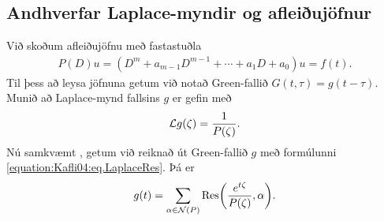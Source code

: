 \documentclass[a4paper,10pt,icelandic]{sphinxmanual}
\begin{document}
\subsection{Andhverfar Laplace-myndir og afleiðujöfnur}
\label{\detokenize{Kafli04:andhverfar-laplace-myndir-og-afleiujofnur}}
Við skoðum afleiðujöfnu með fastastuðla
\begin{equation*}
\begin{split}P(D)u=(D^m+a_{m-1}D^{m-1}+\cdots+a_1D+a_0)u=f(t).\end{split}
\end{equation*}
Til þess að leysa jöfnuna getum við notað Green-fallið \(G(t,\tau)=g(t-\tau)\).
Munið að Laplace-mynd fallsins \(g\) er gefin með
\begin{equation*}
\begin{split}{{\cal L}}g(\zeta)=\dfrac 1{P(\zeta)}.\end{split}
\end{equation*}
Nú samkvæmt {\hyperref[\detokenize{Kafli04:laplaceres}]{}}, getum við reiknað út Green-fallið \(g\) með formúlunni \eqref{equation:Kafli04:eq.LaplaceRes}. Þá er
\begin{equation}\label{equation:Kafli04:eq.GreenLaplace}
\begin{split}g(t)= \sum\limits_{\alpha\in{\cal N}(P)}
{{\operatorname{Res}}}\bigg( \dfrac {e^{t\zeta}}{P(\zeta)},\alpha\bigg).\end{split}
\end{equation}
\end{document}

